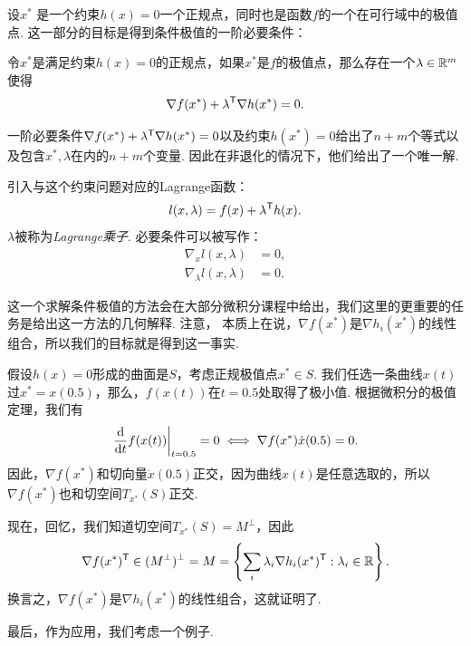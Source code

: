 设$x^*$ 是一个约束$h(x)=0$一个正规点，同时也是函数$f$的一个在可行域中的极值点. 这一部分的目标是得到条件极值的一阶必要条件：
\begin{theorem}[条件极值的一阶必要条件]\label{theorem:eq-opt-cond-1}
    令$x^*$是满足约束${h(x)=0}$的正规点，如果$x^*$是$f$的极值点，那么存在一个${\lambda}\in \mathbb{R}^m$使得
    \[\nabla f(x^*)+{\lambda^{\mathsf{T}} \nabla h(x^*)=0}. \]
\end{theorem}

一阶必要条件$\nabla f(x^*)+{\lambda^{\mathsf{T}}}\nabla {h(x^*)=0}$以及约束${h(x^*)=0}$给出了$n+m$个等式以及包含${x^*,\lambda}$在内的$n+m$个变量. 因此在非退化的情况下，他们给出了一个唯一解. 

引入与这个约束问题对应的Lagrange函数：
        \[l({x,\lambda})=f(x)+{\lambda^{\mathsf{T}} h(x)}.\]
$\lambda$被称为\textit{Lagrange乘子}. 必要条件可以被写作：
\begin{align*}
    \nabla_x l({x,\lambda})&=0,\\
    \nabla_{\lambda} l({x,\lambda})&=0.
\end{align*}

这一个求解条件极值的方法会在大部分微积分课程中给出，我们这里的更重要的任务是给出这一方法的几何解释. 注意， 本质上在说，$\nabla f(x^*)$是$\nabla h_i(x^*)$的线性组合，所以我们的目标就是得到这一事实. 

假设$h(x)=0$形成的曲面是$S$，考虑正规极值点$x^*\in S$. 我们任选一条曲线$x(t)$过$x^*=x(0.5)$，那么，$f(x(t))$在$t=0.5$处取得了极小值. 根据微积分的极值定理，我们有
\[\left.\frac{\mathrm{d}}{\mathrm{d} t}f(x(t))\right|_{t=0.5}=0\iff \nabla f(x^*)\dot{x}(0.5)=0.\]
因此，$\nabla f(x^*)$和切向量$\dot{x}(0.5)$正交，因为曲线$x(t)$是任意选取的，所以$\nabla f(x^*)$也和切空间$T_{x^*}(S)$正交.

现在，回忆，我们知道切空间$T_{x^*}(S)=M^\perp$，因此
\[\nabla f(x^*)^{\mathsf{T}}\in (M^\perp)^\perp=M=\left\{\sum_{i} \lambda_i \nabla h_i(x^*)^{\mathsf{T}}:\lambda_i\in\mathbb{R}\right\}.\]
换言之，$\nabla f(x^*)$是$\nabla h_i(x^*)$的线性组合，这就证明了.


最后，作为应用，我们考虑一个例子.

